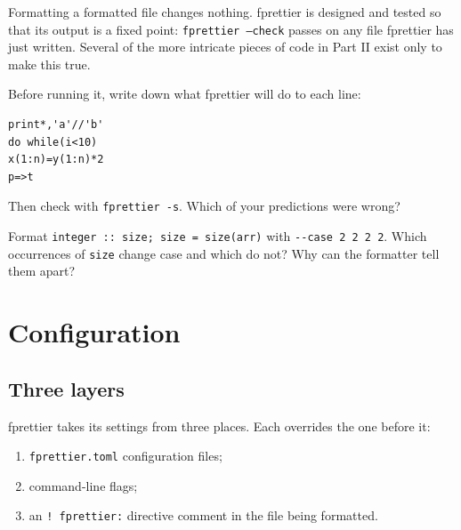 \documentclass[11pt,a4paper,openany]{book}
\newcommand{\code}[1]{\texttt{\small #1}}
\newcommand{\file}[1]{\texttt{\small\color{accent}#1}}
\newcounter{exercise}[chapter]
\begin{document}
\begin{keyidea}[Idempotence]
Formatting a formatted file changes nothing. fprettier is designed and tested
so that its output is a fixed point: \code{fprettier --check} passes on any file
fprettier has just written. Several of the more intricate pieces of code in
Part II exist only to make this true.
\end{keyidea}

\begin{exercise}
Before running it, write down what fprettier will do to each line:
\begin{lstlisting}[style=fortran]
print*,'a'//'b'
do while(i<10)
x(1:n)=y(1:n)*2
p=>t
\end{lstlisting}
Then check with \code{fprettier -s}. Which of your predictions were wrong?
\end{exercise}

\begin{exercise}
Format \code{integer :: size; size = size(arr)} with \code{-{}-case 2 2 2 2}.
Which occurrences of \code{size} change case and which do not? Why can the
formatter tell them apart?
\end{exercise}

\chapter{Configuration}\label{ch:config}

\section{Three layers}

fprettier takes its settings from three places. Each overrides the one before it:

\begin{enumerate}
  \item \file{fprettier.toml} configuration files;
  \item command-line flags;
  \item an \code{! fprettier:} directive comment in the file being formatted.
\end{enumerate}
\end{document}
